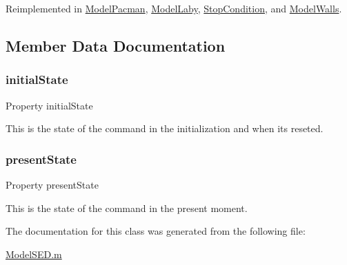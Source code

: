 Reimplemented in \hyperlink{class_model_pacman_a3140f24c6c4b80037b7d4f521c6ae2d3}{Model\+Pacman}, \hyperlink{class_model_laby_a3140f24c6c4b80037b7d4f521c6ae2d3}{Model\+Laby}, \hyperlink{class_stop_condition_a3140f24c6c4b80037b7d4f521c6ae2d3}{Stop\+Condition}, and \hyperlink{class_model_walls_a3140f24c6c4b80037b7d4f521c6ae2d3}{Model\+Walls}.



\subsection{Member Data Documentation}
\mbox{\label{class_model_s_e_d_acd9263acfa96c9138afdf497e55acc24}} 
\subsubsection{\texorpdfstring{initial\+State}{initialState}}
{\footnotesize\ttfamily Property initial\+State}



This is the state of the command in the initialization and when it\textquotesingle{}s reseted. 

\mbox{\label{class_model_s_e_d_a9624cc7c421a50fa5086b0ebd0cd5fe3}} 
\subsubsection{\texorpdfstring{present\+State}{presentState}}
{\footnotesize\ttfamily Property present\+State}



This is the state of the command in the present moment. 



The documentation for this class was generated from the following file\+:\begin{DoxyCompactItemize}
\item 
\hyperlink{_model_s_e_d_8m}{Model\+S\+E\+D.\+m}\end{DoxyCompactItemize}
